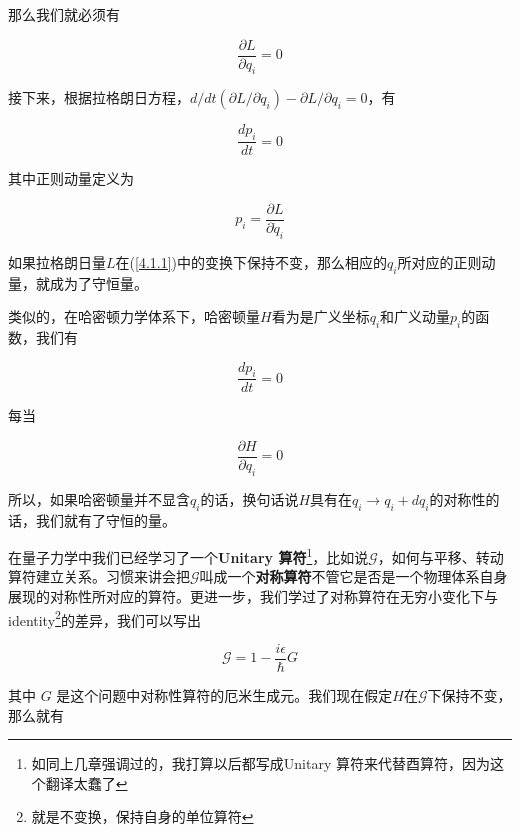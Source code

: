 \documentclass[UTF8,twoside]{ctexart}
\begin{document}
\noindent 那么我们就必须有

\begin{equation}
\frac{\partial{L}}{\partial{q_i}} = 0
\end{equation}

\noindent 接下来，根据拉格朗日方程，$d/dt(\partial L/\partial \dot{q}_i) - \partial L /\partial q_i = 0$，有

\begin{equation}
\frac{dp_i}{dt} = 0
\end{equation}

\noindent 其中正则动量定义为

\begin{equation}
p_i = \frac{\partial L}{\partial \dot{q}_i}
\end{equation}

\noindent 如果拉格朗日量$L$在({\ref{4.1.1}})中的变换下保持不变，那么相应的$q_i$所对应的正则动量，就成为了守恒量。

类似的，在哈密顿力学体系下，哈密顿量$H$看为是广义坐标$q_i$和广义动量$p_i$的函数，我们有

\begin{equation}
\frac{dp_i}{dt} = 0
\end{equation}

\noindent 每当

\begin{equation}
\frac{\partial H}{\partial q_i} = 0
\end{equation}

\noindent 所以，如果哈密顿量并不显含$q_i$的话，换句话说$H$具有在$q_i \rightarrow q_i + dq_i$的对称性的话，我们就有了守恒的量。\\


\noindent 在量子力学中我们已经学习了一个{\textbf{Unitary 算符}}\footnote[1]{如同上几章强调过的，我打算以后都写成Unitary 算符来代替酉算符，因为这个翻译太蠢了}，比如说$\mathscr{G}$，如何与平移、转动算符建立关系。习惯来讲会把$\mathscr{G}$叫成一个{\textbf{对称算符}}不管它是否是一个物理体系自身展现的对称性所对应的算符。更进一步，我们学过了对称算符在无穷小变化下与identity\footnote[2]{就是不变换，保持自身的单位算符}的差异，我们可以写出

\begin{equation}
\mathscr{G} = 1 - \frac{i\epsilon}{\hbar}G
\end{equation}

\noindent 其中 $G$ 是这个问题中对称性算符的厄米生成元。我们现在假定$H$在$\mathscr{G}$下保持不变，那么就有
\end{document}
